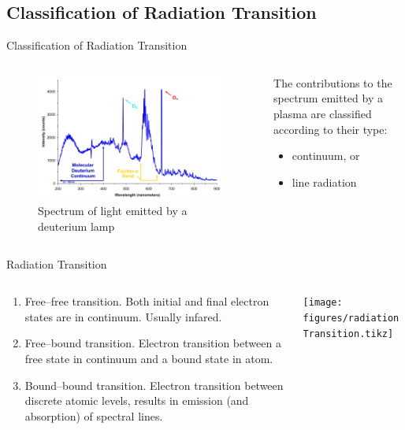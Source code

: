 \documentclass[draft]{beamer}
\begin{document}
\subsection{Classification of Radiation Transition}
\begin{frame}{Classification of Radiation Transition}
  \begin{columns}%
  \begin{column}{0.6\textwidth}
  \begin{figure}
    \includegraphics[width=\textwidth]{figures/Deuterium_lamp_1.png} 
    \caption{Spectrum of light emitted by a deuterium lamp}
  \end{figure}
  \end{column}  
  \begin{column}{0.4\textwidth}
  The contributions to the spectrum emitted by a plasma are classified according to their type:
  \begin{itemize}
    \item continuum, or
    \item line radiation
  \end{itemize}
  \end{column}
  \end{columns}
\end{frame}
\begin{frame}{Radiation Transition}
  \begin{columns}%
  \begin{column}{0.6\textwidth}
  \begin{enumerate}
    \item Free--free transition. Both initial and final electron states are in continuum. Usually infared.
    \item Free--bound transition. Electron transition between a free state in continuum and a bound state in atom.
    \item Bound--bound transition. Electron transition between discrete atomic levels, results in emission (and absorption) of spectral lines.
  \end{enumerate}
  \end{column}
  \begin{column}{0.4\textwidth}
  \texttt{[image: figures/radiationTransition.tikz]}
  \end{column}
  \end{columns}
\end{frame}
\end{document}
